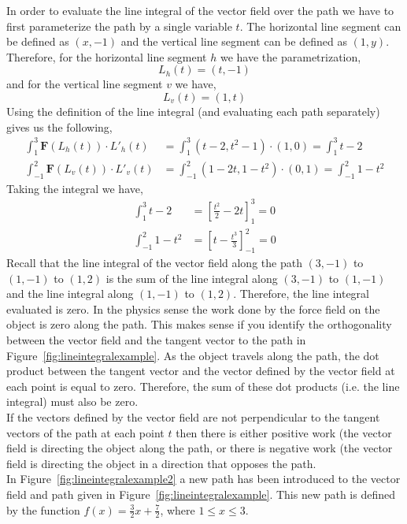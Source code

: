 \documentclass[12pt]{article}
\begin{document}
 In order to evaluate the line integral of the vector field over the path we have to first parameterize the path by a single variable $t$. The horizontal line segment can be defined as $(x,-1)$ and the vertical line segment can be defined as $(1,y)$.  Therefore, for the horizontal line segment $h$ we have the parametrization,
\[
L_h(t) = (t,-1)
\] 
and for the vertical line segment $v$ we have,
\[
L_v(t) = (1,t)
\]
Using the definition of the line integral (and evaluating each path separately) gives us the following,
\begin{align*}
\int_{1}^{3} \mathbf{F}(L_h(t)) \cdot L'_h(t) &= \int_{1}^{3} (t-2,t^2-1) \cdot (1,0) = \int_{1}^{3} t-2 \\
\int_{-1}^{2} \mathbf{F}(L_v(t)) \cdot L'_v(t) &= \int_{-1}^{2} (1-2t,1-t^2) \cdot (0,1) = \int_{-1}^{2} 1-t^2
\end{align*}
Taking the integral we have,
\begin{align*}
\int_{1}^{3} t-2 &= \left[ \frac{t^2}{2} - 2t \right]_1^3 = 0 \\
\int_{-1}^{2} 1-t^2 &=  \left[ t - \frac{t^3}{3} \right]_{-1}^2 = 0
\end{align*}
Recall that the line integral of the vector field along the path $(3,-1)$ to $(1,-1)$ to $(1,2)$ is the sum of the line integral along $(3,-1)$ to $(1,-1)$ and the line integral along $(1,-1)$ to $(1,2)$. Therefore, the line integral evaluated is zero. In the physics sense the work done by the force field on the object is zero along the path. This makes sense if you identify the orthogonality between the vector field and the tangent vector to the path in Figure~\ref{fig:lineintegralexample}. As the object travels along the path, the dot product between the tangent vector and the vector defined by the vector field at each point is equal to zero. Therefore, the sum of these dot products (i.e. the line integral) must also be zero. \\

 If the vectors defined by the vector field are not perpendicular to the tangent vectors of the path at each point $t$ then there is either positive work (the vector field is directing the object along the path, or there is negative work (the vector field is directing the object in a direction that opposes the path. \\

 In Figure~\ref{fig:lineintegralexample2} a new path has been introduced to the vector field and path given in Figure~\ref{fig:lineintegralexample}. This new path is defined by the function $f(x) = \frac{3}{2}x + \frac{7}{2}$, where $1\leq x \leq3$. \\
\end{document}
